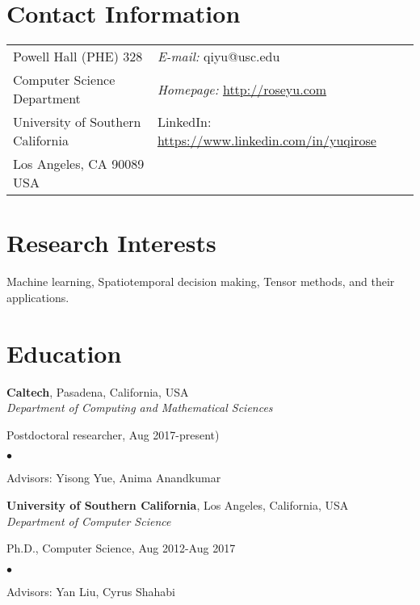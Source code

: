 \documentclass[margin,line]{res}
\newenvironment{list1}{
  \begin{list}{\ding{113}}{%
      \setlength{\itemsep}{0in}
      \setlength{\parsep}{0in} \setlength{\parskip}{0in}
      \setlength{\topsep}{0in} \setlength{\partopsep}{0in} 
      \setlength{\leftmargin}{0.17in}}}{\end{list}}
\newenvironment{list2}{
  \begin{list}{$\bullet$}{%
      \setlength{\itemsep}{0in}
      \setlength{\parsep}{0in} \setlength{\parskip}{0in}
      \setlength{\topsep}{0in} \setlength{\partopsep}{0in} 
      \setlength{\leftmargin}{0.2in}}}{\end{list}}
\begin{document}

\begin{resume}
\section{\sc Contact Information}
\vspace{.05in}
\begin{tabular}{@{}p{2in}p{4in}}
Powell Hall (PHE) 328 & {\it E-mail:}  qiyu@usc.edu  \\   
Computer Science Department  &  {\it Homepage:} \url{http://roseyu.com} \\            
University of Southern California & {LinkedIn:}  \url{https://www.linkedin.com/in/yuqirose}\\
Los Angeles, CA 90089 USA  & \\     
\end{tabular}


\section{\sc Research Interests}
Machine learning, Spatiotemporal decision making, Tensor methods, and their applications.

\section{\sc Education}
{\bf Caltech}, Pasadena, California, USA\\
{\em Department of Computing and Mathematical Sciences} 
\begin{list1}
	\item[] Postdoctoral researcher,  Aug 2017-present) 
	\begin{list2}
		\vspace*{.05in}
		\item Advisors:  Yisong Yue, Anima Anandkumar
	\end{list2}
\vspace*{.05in}
\end{list1}

{\bf University of Southern California}, Los Angeles, California, USA\\
{\em Department of Computer Science} 
\begin{list1}
\item[] Ph.D., Computer Science,  Aug 2012-Aug 2017
\begin{list2}
\vspace*{.05in}
\item Advisors:  Yan Liu, Cyrus Shahabi
\end{list2}



\end{list1}
\end{resume}
\end{document}
